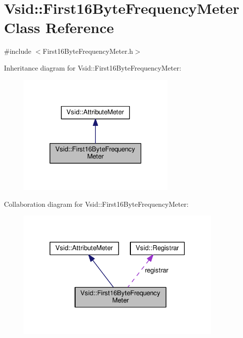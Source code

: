 \hypertarget{class_vsid_1_1_first16_byte_frequency_meter}{\section{Vsid\-:\-:First16\-Byte\-Frequency\-Meter Class Reference}
\label{class_vsid_1_1_first16_byte_frequency_meter}
}


{\ttfamily \#include $<$First16\-Byte\-Frequency\-Meter.\-h$>$}



Inheritance diagram for Vsid\-:\-:First16\-Byte\-Frequency\-Meter\-:
\nopagebreak
\begin{figure}[H]
\begin{center}
\leavevmode
\includegraphics[width=218pt]{class_vsid_1_1_first16_byte_frequency_meter__inherit__graph}
\end{center}
\end{figure}


Collaboration diagram for Vsid\-:\-:First16\-Byte\-Frequency\-Meter\-:
\nopagebreak
\begin{figure}[H]
\begin{center}
\leavevmode
\includegraphics[width=284pt]{class_vsid_1_1_first16_byte_frequency_meter__coll__graph}
\end{center}
\end{figure}
